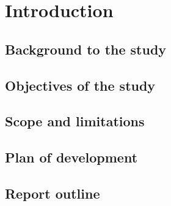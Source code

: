 \section{Introduction}
\subsection{Background to the study}
\subsection{Objectives of the study}
\subsection{Scope and limitations}
\subsection{Plan of development}
\subsection{Report outline}
